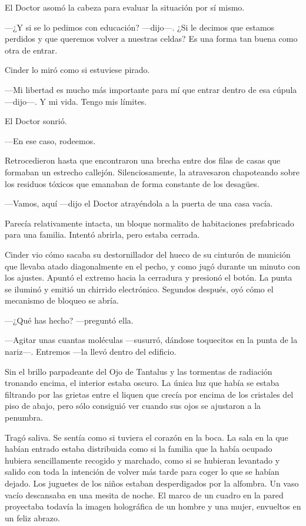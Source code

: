 El Doctor asomó la cabeza para evaluar la situación por sí mismo.

—¿Y si se lo pedimos con educación? —dijo—. ¿Si le decimos que estamos perdidos y que queremos volver a nuestras celdas? Es una forma tan buena como otra de entrar.

Cinder lo miró como si estuviese pirado.

—Mi libertad es mucho más importante para mí que entrar dentro de esa cúpula —dijo—. Y mi vida. Tengo mis límites.

El Doctor sonrió.

—En ese caso, rodeemos.

Retrocedieron hasta que encontraron una brecha entre dos filas de casas que formaban un estrecho callejón. Silenciosamente, la atravesaron chapoteando sobre los residuos tóxicos que emanaban de forma constante de los desagües.

—Vamos, aquí —dijo el Doctor atrayéndola a la puerta de una casa vacía. 

Parecía relativamente intacta, un bloque normalito de habitaciones prefabricado para una familia. Intentó abrirla, pero estaba cerrada.

Cinder vio cómo sacaba su destornillador del hueco de su cinturón de munición que llevaba atado diagonalmente en el pecho, y como jugó durante un minuto con los ajustes. Apuntó el extremo hacia la cerradura y presionó el botón. La punta se iluminó y emitió un chirrido electrónico. Segundos después, oyó cómo el mecanismo de bloqueo se abría.

—¿Qué has hecho? —preguntó ella.

—Agitar unas cuantas moléculas —susurró, dándose toquecitos en la punta de la nariz—. Entremos —la llevó dentro del edificio.

Sin el brillo parpadeante del Ojo de Tantalus y las tormentas de radiación tronando encima, el interior estaba oscuro. La única luz que había se estaba filtrando por las grietas entre el liquen que crecía por encima de los cristales del piso de abajo, pero sólo consiguió ver cuando sus ojos se ajustaron a la penumbra.

Tragó saliva. Se sentía como si tuviera el corazón en la boca. La sala en la que habían entrado estaba distribuida como si la familia que la había ocupado hubiera sencillamente recogido y marchado, como si se hubieran levantado y salido con toda la intención de volver más tarde para coger lo que se habían dejado. Los juguetes de los niños estaban desperdigados por la alfombra. Un vaso vacío descansaba en una mesita de noche. El marco de un cuadro en la pared proyectaba todavía la imagen holográfica de un hombre y una mujer, envueltos en un feliz abrazo.

